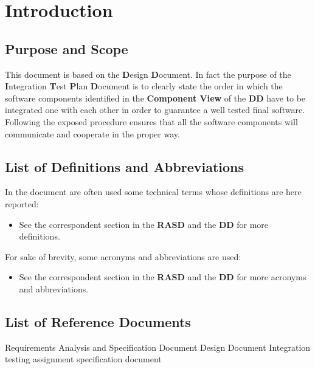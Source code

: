 \section{Introduction}


\subsection{Purpose and Scope}
This document is based on the \textbf{D}esign \textbf{D}ocument. In fact the purpose of the \textbf{I}ntegration \textbf{T}est \textbf{P}lan \textbf{D}ocument is to clearly state the order in which the software components identified in the \textbf{Component View} of the \textbf{DD} have to be integrated one with each other in order to guarantee a well tested final software. Following the exposed procedure ensures that all the software components will communicate and cooperate in the proper way.

\subsection{List of Definitions and Abbreviations}
In the document are often used some technical terms whose definitions are here reported:
\begin{itemize}
	 An atomic procedure done to test the integration of a component on the top of another one.
	 A collection of \textbf{Integration Test Cases}.
	\item See the correspondent section in the \textbf{RASD} and the \textbf{DD} for more definitions.
\end{itemize}
For sake of brevity, some acronyms and abbreviations are used:
\begin{itemize}
	 Integration Test Suite number n.
	 Integration Test Case number m of the Integration Test Suite number n.
	 JavaScript.
	 User Interface.
	\item See the correspondent section in the \textbf{RASD} and the \textbf{DD} for more acronyms and abbreviations.
\end{itemize}


\subsection{List of Reference Documents}
\begin{itemize}
	 Requirements Analysis and Specification Document
	 Design Document
	 Integration testing assignment specification document
\end{itemize}

